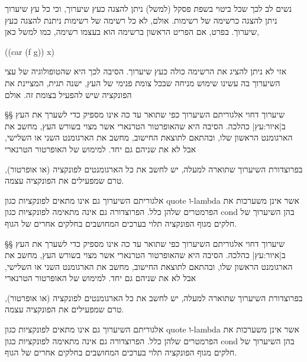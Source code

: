 נשים לב לכך שכל ביטוי בשפת פסקל (למשל) ניתן להצגה כעץ שיערוך, וכי כל עץ שיערוך
ניתן להצגה כרשימה של רשימות. אולם, לא כל רשימה של רשימות ניתנת להצגה כעץ
שיערוך. בפרט, אם הפריט הראשון ברשימה הוא בעצמו רשימה, כמו למשל כאן,
\begin{LISP}
((car (f g)) x)
\end{LISP}
אזי לא ניתן להציג את הרשימה כולה כעץ שיערוך. הסיבה לכך היא שהטופולוגיה של עצי
השיערוך בה עשינו שימוש מניחה שבכל צומת פנימי של העץ, ישנה תגית, המציינת את
הפונקציה שיש להפעיל בצומת זה. אולם

§§ שיערוך דחוי
אלגוריתם השיערוך כפי שתואר עד כה אינו מספיק כדי לשערך את העץ ב|איור:עץ|
כהלכה. הסיבה היא שהאופרטור הטרנארי  אשר מצוי בשורש העץ, מחשב את
הארגומנט
הראשון שלו, ובהתאם לתוצאת החישוב, מחשב את הארגומנט השני או השלישי, אבל לא את
שניהם גם יחד. למימוש של האופרטור הטרנארי

בפרוצדורת השיערוך שתוארה למעלה, יש לחשב את כל הארגומנטים לפונקציה
(או אופרטור), טרם שמפעילים את הפונקציה עצמה.

אלגוריתם השיערוך גם אינו מתאים לפונקציות כגון quote ו-lambda אשר אינן משערכות
את הפרמטרים שלהן כלל. הפרוצדורה גם אינה מתאימה לפונקציות כגון cond בהן השיערוך
של חלקים מגוף הפונקציה תלוי בערכים המחושבים בחלקים אחרים של הגוף.

§§ שיערוך דחוי
אלגוריתם השיערוך כפי שתואר עד כה אינו מספיק כדי לשערך את העץ ב|איור:עץ|
כהלכה. הסיבה היא שהאופרטור הטרנארי  אשר מצוי בשורש העץ, מחשב את
הארגומנט
הראשון שלו, ובהתאם לתוצאת החישוב, מחשב את הארגומנט השני או השלישי, אבל לא את
שניהם גם יחד. למימוש של האופרטור הטרנארי

בפרוצדורת השיערוך שתוארה למעלה, יש לחשב את כל הארגומנטים לפונקציה
(או אופרטור), טרם שמפעילים את הפונקציה עצמה.

אלגוריתם השיערוך גם אינו מתאים לפונקציות כגון quote ו-lambda אשר אינן משערכות
את הפרמטרים שלהן כלל. הפרוצדורה גם אינה מתאימה לפונקציות כגון cond בהן השיערוך
של חלקים מגוף הפונקציה תלוי בערכים המחושבים בחלקים אחרים של הגוף.


